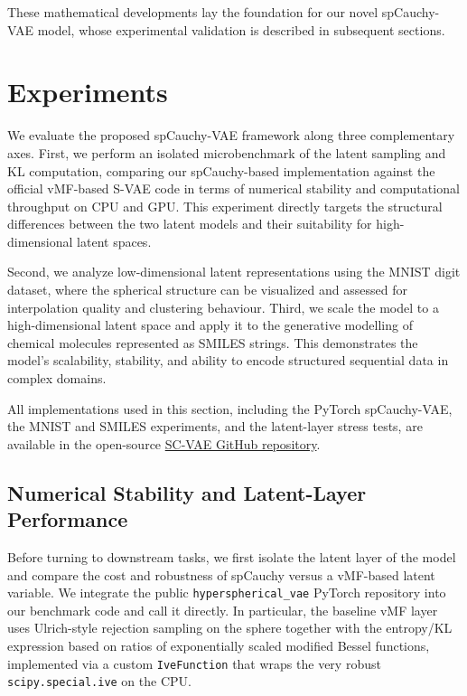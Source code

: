 \documentclass{article}
\begin{document}
These mathematical developments lay the foundation for our novel spCauchy-VAE model, whose experimental validation is described in subsequent sections.

\section{Experiments}

We evaluate the proposed spCauchy-VAE framework along three complementary axes.
First, we perform an isolated microbenchmark of the latent sampling and KL computation,
comparing our spCauchy-based implementation against the official vMF-based S-VAE code
in terms of numerical stability and computational throughput on CPU and GPU.
This experiment directly targets the structural differences between the two latent models
and their suitability for high-dimensional latent spaces.

Second, we analyze low-dimensional latent representations using the MNIST digit dataset,
where the spherical structure can be visualized and assessed for interpolation quality
and clustering behaviour. Third, we scale the model to a high-dimensional latent space
and apply it to the generative modelling of chemical molecules represented as SMILES
strings. This demonstrates the model's scalability, stability, and ability to encode
structured sequential data in complex domains.

All implementations used in this section, including the PyTorch spCauchy-VAE,
the MNIST and SMILES experiments, and the latent-layer stress tests, are available
in the open-source \href{https://github.com/lsablica/SC-VAE}{SC-VAE GitHub repository}.



\subsection{Numerical Stability and Latent-Layer Performance}
\label{subsec:throughput}

Before turning to downstream tasks, we first isolate the latent layer of the model and compare the cost and robustness of spCauchy versus a vMF-based latent variable. We integrate the public \texttt{hyperspherical\_vae} PyTorch repository \citep{davidson2018hyperspherical} into our benchmark code and call it directly. In particular, the baseline vMF layer uses Ulrich-style rejection sampling on the sphere \citep{Ulrich} together with the entropy/KL expression based on ratios of exponentially scaled modified Bessel functions, implemented via a custom \texttt{IveFunction} that wraps the very robust \texttt{scipy.special.ive} on the CPU.
\end{document}
